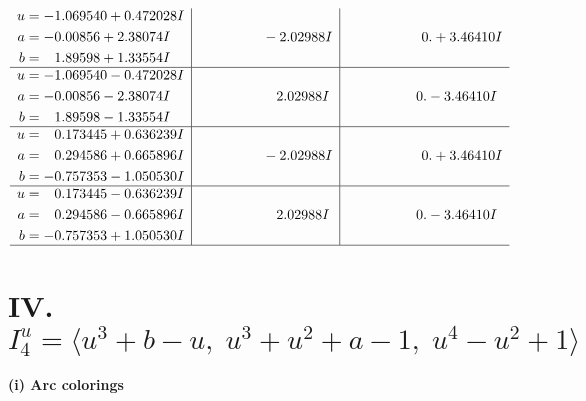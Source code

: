 \documentclass[1p]{elsarticle_modified}
\theoremstyle{definition}
\begin{document}
$$\begin{array}{c|c|c}
\begin{aligned}
u &= -1.069540 + 0.472028 I \\
a &= -0.00856 + 2.38074 I \\
b &= \phantom{-}1.89598 + 1.33554 I\end{aligned}
 & \phantom{-0.000000 } -2.02988 I & \phantom{-0.000000 -}0. + 3.46410 I \\ \hline\begin{aligned}
u &= -1.069540 - 0.472028 I \\
a &= -0.00856 - 2.38074 I \\
b &= \phantom{-}1.89598 - 1.33554 I\end{aligned}
 & \phantom{-0.000000 -}2.02988 I & \phantom{-0.000000 } 0. - 3.46410 I \\ \hline\begin{aligned}
u &= \phantom{-}0.173445 + 0.636239 I \\
a &= \phantom{-}0.294586 + 0.665896 I \\
b &= -0.757353 - 1.050530 I\end{aligned}
 & \phantom{-0.000000 } -2.02988 I & \phantom{-0.000000 -}0. + 3.46410 I \\ \hline\begin{aligned}
u &= \phantom{-}0.173445 - 0.636239 I \\
a &= \phantom{-}0.294586 - 0.665896 I \\
b &= -0.757353 + 1.050530 I\end{aligned}
 & \phantom{-0.000000 -}2.02988 I & \phantom{-0.000000 } 0. - 3.46410 I\\
 \hline 
 \end{array}$$\newpage\newpage\renewcommand{\arraystretch}{1}
\centering \section*{IV. $I^u_{4}= \langle u^3+b- u,\;u^3+u^2+a-1,\;u^4- u^2+1 \rangle$}
\flushleft \textbf{(i) Arc colorings}\\
\end{document}
